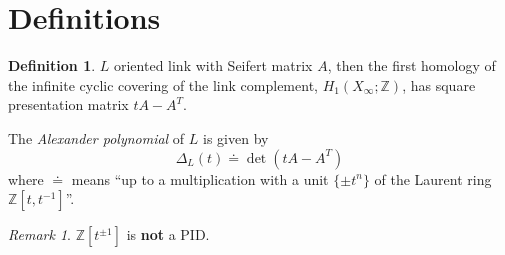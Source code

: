 \documentclass[a4paper]{article}
\theoremstyle{definition}
\newtheorem{definition}[theorem]{Definition}
\theoremstyle{remark}
\newtheorem{remark}[theorem]{Remark}
\newcommand{\Z}{\mathbb{Z}}
\begin{document}
\section{Definitions}

\begin{definition}
	$L$ oriented link with Seifert matrix $A$, then the first homology of
	the infinite cyclic covering of the link complement, $H_1(X_{\infty} ; \Z)$,
	has square presentation matrix $t A - A^{T}$.
	
	The \textit{Alexander polynomial} of $L$ is given by
	\begin{equation*}
		\Delta_{L}(t) \doteq \det(t A - A^{T})
	\end{equation*}
	where $\doteq$ means ``up to a multiplication with a unit $\{ \pm t^{n} \}$
	of the Laurent ring $\Z[t, t^{-1}]$''.
\end{definition}

\begin{remark}
	$\Z[t^{\pm 1}]$ is \textbf{not} a PID.
\end{remark}
	

{}


\printindex
\end{document}
